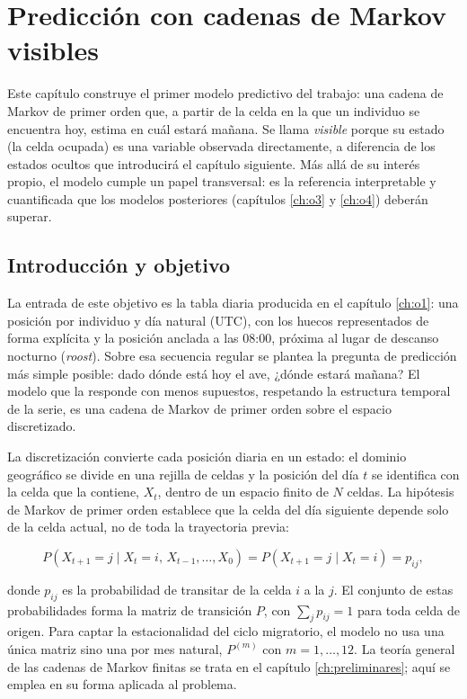 \chapter{Predicción con cadenas de Markov visibles}
\label{ch:o2}

Este capítulo construye el primer modelo predictivo del trabajo: una cadena de
Markov de primer orden que, a partir de la celda en la que un individuo se
encuentra hoy, estima en cuál estará mañana. Se llama \emph{visible} porque su
estado (la celda ocupada) es una variable observada directamente, a diferencia de
los estados ocultos que introducirá el capítulo siguiente. Más allá de su interés
propio, el modelo cumple un papel transversal: es la referencia interpretable y
cuantificada que los modelos posteriores (capítulos \ref{ch:o3} y \ref{ch:o4})
deberán superar.

\section{Introducción y objetivo}
\label{sec:o2-intro}

La entrada de este objetivo es la tabla diaria producida en el capítulo
\ref{ch:o1}: una posición por individuo y día natural (UTC), con los huecos
representados de forma explícita y la posición anclada a las 08:00, próxima al
lugar de descanso nocturno (\textit{roost}). Sobre esa secuencia regular se
plantea la pregunta de predicción más simple posible: dado dónde está hoy el ave,
¿dónde estará mañana? El modelo que la responde con menos supuestos, respetando la
estructura temporal de la serie, es una cadena de Markov de primer orden sobre el
espacio discretizado.

La discretización convierte cada posición diaria en un estado: el dominio
geográfico se divide en una rejilla de celdas y la posición del día $t$ se
identifica con la celda que la contiene, $X_t$, dentro de un espacio finito de $N$
celdas. La hipótesis de Markov de primer orden establece que la celda del día
siguiente depende solo de la celda actual, no de toda la trayectoria previa:

\begin{equation}
  P(X_{t+1} = j \mid X_t = i,\, X_{t-1}, \dots, X_0)
  = P(X_{t+1} = j \mid X_t = i) = p_{ij},
  \label{eq:o2-markov}
\end{equation}

donde $p_{ij}$ es la probabilidad de transitar de la celda $i$ a la $j$. El
conjunto de estas probabilidades forma la matriz de transición $P$, con
$\sum_j p_{ij} = 1$ para toda celda de origen. Para captar la estacionalidad del
ciclo migratorio, el modelo no usa una única matriz sino una por mes natural,
$P^{(m)}$ con $m = 1, \dots, 12$. La teoría general de las cadenas de Markov
finitas se trata en el capítulo \ref{ch:preliminares}; aquí se emplea en su forma
aplicada al problema.

